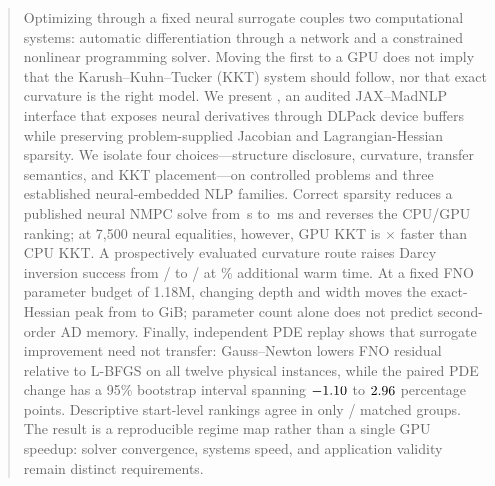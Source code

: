 \begin{abstract}
Optimizing through a fixed neural surrogate couples two computational systems:
automatic differentiation through a network and a constrained nonlinear
programming solver.  Moving the first to a GPU does not imply that the
Karush--Kuhn--Tucker (KKT) system should follow, nor that exact curvature is the
right model.  We present \method, an audited JAX--MadNLP interface that exposes
neural derivatives through DLPack device buffers while preserving
problem-supplied Jacobian and Lagrangian-Hessian sparsity.  We isolate four
choices---structure disclosure, curvature, transfer semantics, and KKT
placement---on controlled problems and three established neural-embedded NLP
families.  Correct sparsity reduces a published neural NMPC solve from
\PFRCaseOneDenseCPU\,s to \PFRCaseOneSparseCPU\,ms and reverses the CPU/GPU
ranking; at 7,500 neural equalities, however, GPU KKT is
\PFRCaseThreeSpeedup$\times$ faster than CPU KKT.  A prospectively evaluated
curvature route raises Darcy inversion success from \DarcyRouteBase/\DarcyRouteTotal{}
to \DarcyRouteTotal/\DarcyRouteTotal{} at \DarcyRouteOverhead\% additional warm
time.  At a fixed FNO parameter budget of 1.18M, changing depth and width moves the
exact-Hessian peak from \FNOShapeMinMemory{} to \FNOShapeMaxMemory{} GiB;
parameter count alone does not predict second-order AD memory.  Finally,
independent PDE replay shows that surrogate improvement need
not transfer: Gauss--Newton lowers FNO residual relative to L-BFGS on all
twelve physical instances, while the paired PDE change has a 95\% bootstrap
interval spanning $\ReplayPairedPDEDeltaLow$ to
$\ReplayPairedPDEDeltaHigh$ percentage points.  Descriptive start-level
rankings agree in only \ReplayAgreement/\ReplayGroups{} matched groups.  The
result is a reproducible regime map rather than a single GPU speedup: solver
convergence, systems speed, and application validity remain distinct
requirements.
\end{abstract}
